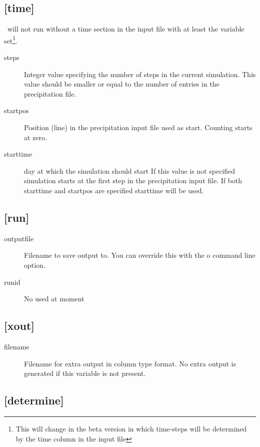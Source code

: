 \subsection{[time]}\label{section:time}

\vamps\ will not run without a time section in the input file with at
least the  variable set\footnote{This will change in the beta
version in which time-steps will be determined by the time column in the
input file}.  

\begin{description}
\item[steps] Integer value specifying the number of steps in the 
current simulation.  This value should be smaller or equal to the
number of entries in the precipitation file.

\item[startpos] Position (line) in the precipitation input file used as
start. Counting starts at zero.

\item[starttime] 
day at which the simulation should start If this value is not
specified simulation starts at the first step in the precipitation
input file.  If both starttime and startpos are specified starttime
will be used.
\end{description}

\subsection{[run]}
\begin{description}
\item[outputfile]
Filename to save output to. You can override this with the \-o command
line option.

\item[runid]
No used at moment
\end{description}

\subsection{[xout]}\label{section:xout}
\begin{description}
\item[filename]
Filename for extra output in column type format. No extra output is generated if
this variable is not present.
\end{description}


\subsection{[determine]}\label{section:determine}

